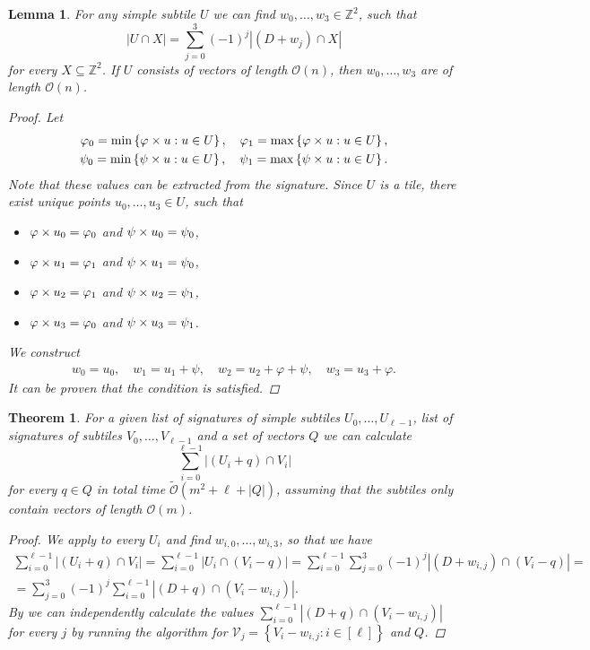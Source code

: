 \documentclass[11pt, letterpaper]{article}
\theoremstyle{plain}
\newtheorem{theorem}{Theorem}
\newtheorem{lemma}{Lemma}
\theoremstyle{definition}
\theoremstyle{remark}
\newcommand{\Z}{\mathbb{Z}}
\renewcommand{\O}{\mathcal{O}}
\newcommand{\tO}{\tilde{\mathcal{O}}}
\newcommand{\V}{\mathcal{V}}
\renewcommand{\phi}{\varphi}
\newcommand{\set}[1]{\left\lbrace #1 \right\rbrace}
\newcommand{\eq}[1]{\begin{align*} #1 \end{align*}}
\begin{document}
\begin{lemma}\label{primitive}
	For any simple subtile $U$ we can find $w_0, \dots, w_3 \in \Z^2$, such that
	\[ |U \cap X| = \sum_{j = 0}^3 (-1)^j |(D + w_j) \cap X|\]
	for every $X \subseteq \Z^2$.
	If $U$ consists of vectors of length $\O(n)$, then $w_0, \dots, w_3$ are of length $\O(n)$.
	\begin{proof}
		Let \eq{
			\phi_0 = \min\set{{\h{u} : u \in U}}, \quad 
			\phi_1 = \max\set{{\h{u} : u \in U}},\\
			\psi_0 = \min\set{{\s{u} : u \in U}}, \quad
			\psi_1 = \max\set{{\s{u} : u \in U}}.
		}
		Note that these values can be extracted from the signature.
		Since $U$ is a tile, there exist unique points $u_0, \dots, u_3 \in U$, such that
		\begin{itemize}
			\item $\h{u_0} = \phi_0$ and $\psi \times u_0 = \psi_0$,
			\item $\h{u_1} = \phi_1$ and $\psi \times u_1 = \psi_0$,
			\item $\h{u_2} = \phi_1$ and $\psi \times u_2 = \psi_1$,
			\item $\h{u_3} = \phi_0$ and $\psi \times u_3 = \psi_1$.
		\end{itemize}
		We construct \eq{
			w_0 = u_0, \quad 
			w_1 = u_1 + \psi, \quad
			w_2 = u_2 + \phi + \psi, \quad
			w_3 = u_3 + \phi.
		}
		It can be proven that the condition is satisfied.
	\end{proof}
\end{lemma}

\begin{theorem}\label{subtile_convolution}
	For a given list of signatures of simple subtiles $U_0, \dots, U_{\ell - 1}$, list of signatures of subtiles $V_0, \dots, V_{\ell - 1}$ and a set of vectors $Q$ we can calculate
	\[ \sum_{i = 0}^{\ell - 1} |(U_i + q) \cap V_i| \]
	for every $q \in Q$ in total time $\tO(m^2 + \ell + |Q|)$, assuming that the subtiles only contain vectors of length $\O(m)$.
	\begin{proof}
		We apply  to every $U_i$ and find $w_{i, 0}, \dots, w_{i, 3}$, so that we have
		\eq{
			\sum_{i = 0}^{\ell - 1}|(U_i + q) \cap V_i| 
			= \sum_{i = 0}^{\ell - 1}|U_i \cap (V_i - q)| 
			= \sum_{i = 0}^{\ell - 1} \sum_{j = 0}^3 (-1)^j |(D + w_{i, j}) \cap (V_i - q)| = \\
			= \sum_{j = 0}^3 (-1)^j \sum_{i = 0}^{\ell - 1} |(D + q) \cap (V_i - w_{i, j})|.
		}
		By  we can independently calculate the values $\sum_{i = 0}^{\ell - 1} |(D + q) \cap (V_i - w_{i, j})|$ for every $j$ by running the algorithm for $\V_j = \set{V_i - w_{i, j} : i \in [\ell]}$ and $Q$.
	\end{proof}
\end{theorem}
\end{document}
